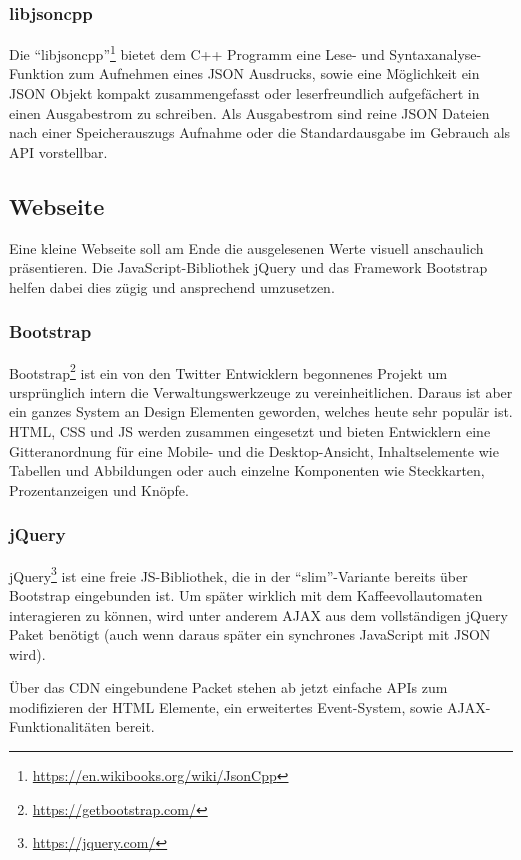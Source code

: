 \subsubsection{libjsoncpp}
Die "`libjsoncpp"'\footnote{\url{https://en.wikibooks.org/wiki/JsonCpp}} bietet dem C++ Programm eine Lese- und Syntaxanalyse-Funktion zum Aufnehmen eines \ac{JSON} Ausdrucks, sowie eine Möglichkeit ein \ac{JSON} Objekt kompakt zusammengefasst oder leserfreundlich aufgefächert in einen Ausgabestrom zu schreiben.
Als Ausgabestrom sind reine \ac{JSON} Dateien nach einer Speicherauszugs Aufnahme oder die Standardausgabe im Gebrauch als API vorstellbar.


\subsection{Webseite}
Eine kleine Webseite soll am Ende die ausgelesenen Werte visuell anschaulich präsentieren.
Die JavaScript-Bibliothek jQuery und das Framework Bootstrap helfen dabei dies zügig und ansprechend umzusetzen.

\subsubsection{Bootstrap}
Bootstrap\footnote{\url{https://getbootstrap.com/}} ist ein von den Twitter Entwicklern begonnenes Projekt um ursprünglich intern die Verwaltungswerkzeuge zu vereinheitlichen.
Daraus ist aber ein ganzes System an Design Elementen geworden, welches heute sehr populär ist.
\ac{HTML}, \ac{CSS} und \ac{JS} werden zusammen eingesetzt und bieten Entwicklern eine Gitteranordnung für eine Mobile- und die Desktop-Ansicht, Inhaltselemente wie Tabellen und Abbildungen oder auch einzelne Komponenten wie Steckkarten, Prozentanzeigen und Knöpfe.

\subsubsection{jQuery}
jQuery\footnote{\url{https://jquery.com/}} ist eine freie \ac{JS}-Bibliothek, die in der "`slim"'-Variante bereits über Bootstrap eingebunden ist.
Um später wirklich mit dem Kaffeevollautomaten interagieren zu können, wird unter anderem \ac{AJAX} aus dem vollständigen jQuery Paket benötigt (auch wenn daraus später ein synchrones JavaScript mit \acs{JSON} wird).

Über das \ac{CDN} eingebundene Packet stehen ab jetzt einfache \aclp{API} zum modifizieren der \acs{HTML} Elemente, ein erweitertes Event-System, sowie \acs{AJAX}-Funktionalitäten bereit.

